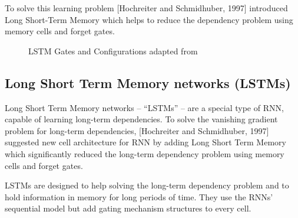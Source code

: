 To solve this learning problem [Hochreiter and Schmidhuber, 1997] introduced Long Short-Term Memory which helps to reduce the dependency problem using memory cells and forget gates.%
\begin{figure}[!t]
 \centering
\caption{LSTM Gates and Configurations adapted from~\cite{colah}}
\end{figure}%
\subsection{Long Short Term Memory networks (LSTMs)}\label{Sec:LSTM}


Long Short Term Memory networks – “LSTMs” – are a special type of RNN, capable of learning long-term dependencies. To solve the vanishing gradient problem for long-term dependencies, [Hochreiter and Schmidhuber, 1997]~\cite{Hochreiter} suggested new cell architecture for RNN by adding Long Short Term Memory which significantly reduced the long-term dependency problem using memory cells and forget gates.

LSTMs are designed to help solving the long-term dependency problem and to hold information in memory for long periods of time. They use the RNNs’ sequential model but add gating mechanism structures to every cell.

